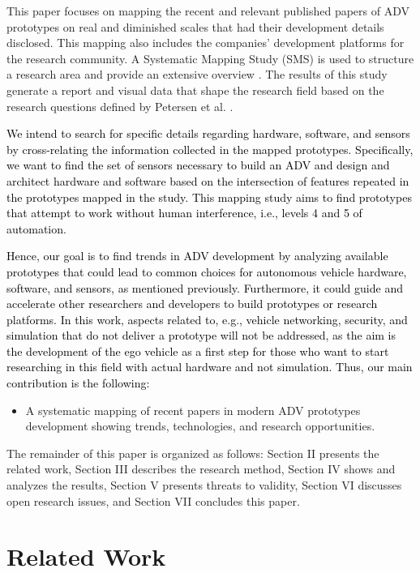 \documentclass[lettersize,journal]{IEEEtran}
\begin{document}
This paper focuses on mapping the recent and relevant published papers of ADV prototypes on real and diminished scales that had their development details disclosed. This mapping also includes the companies' development platforms for the research community. A Systematic Mapping Study (SMS) is used to structure a research area and provide an extensive overview \cite{keele2007guidelines}. The results of this study generate a report and visual data that shape the research field based on the research questions defined by Petersen et al. \cite{petersen2015guidelines}. 

\textcolor{black}{We intend to search for specific details regarding hardware, software, and sensors by cross-relating the information collected in the mapped prototypes. Specifically, we want to find the set of sensors necessary to build an ADV and design and architect hardware and software based on the intersection of features repeated in the prototypes mapped in the study. This mapping study aims to find prototypes that attempt to work without human interference, i.e., levels 4 and 5 of automation.}

\textcolor{black} {Hence, our goal is to find trends in ADV development by analyzing available prototypes that could lead to common choices for autonomous vehicle hardware, software, and sensors, as mentioned previously. Furthermore, it could guide and accelerate other researchers and developers to build prototypes or research platforms. In this work, aspects related to, e.g., vehicle networking, security, and simulation that do not deliver a prototype will not be addressed, as the aim is the development of the ego vehicle as a first step for those who want to start researching in this field with actual hardware and not simulation. Thus, our main contribution is the following:}

 \begin{itemize}
     \item A systematic mapping of recent papers in modern ADV prototypes development showing trends, technologies, and research opportunities.
 \end{itemize}
 
 The remainder of this paper is organized as follows: Section II presents the related work, Section III describes the research method, Section IV shows and analyzes the results, Section V presents threats to validity, Section VI discusses open research issues, and Section VII concludes this paper.


\section{{Related Work}\label{background}}
\end{document}
